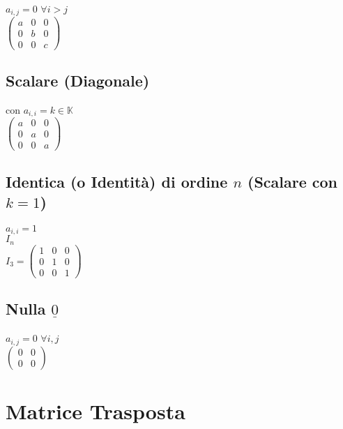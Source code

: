 \documentclass[a4paper, twoside, italian, 11pt]{book}
\newcommand{\K}{\mathbb K}
\begin{document}
$a_{i,j} = 0$ $\forall i > j$ \\

\noindent
$\begin{pmatrix}
a & 0 & 0 \\
0 & b & 0 \\
0 & 0 & c
\end{pmatrix}$


\subsection{Scalare (Diagonale)}

con $a_{i,i} = k \in \K$ \\

\noindent
$\begin{pmatrix}
a & 0 & 0 \\
0 & a & 0 \\
0 & 0 & a
\end{pmatrix}$


\subsection{Identica (o Identità) di ordine $n$ (Scalare con $k = 1$)}

$a_{i,i} = 1$ \\

\noindent
$I_n$ \\

\noindent
$I_3 = \begin{pmatrix}
1 & 0 & 0 \\
0 & 1 & 0 \\
0 & 0 & 1
\end{pmatrix}$


\subsection{Nulla $\underline{0}$}

$a_{i,j} = 0$ $\forall i, j$ \\

\noindent
$\begin{pmatrix}
0 & 0 \\
0 & 0
\end{pmatrix}$



\section{Matrice Trasposta}
\end{document}
